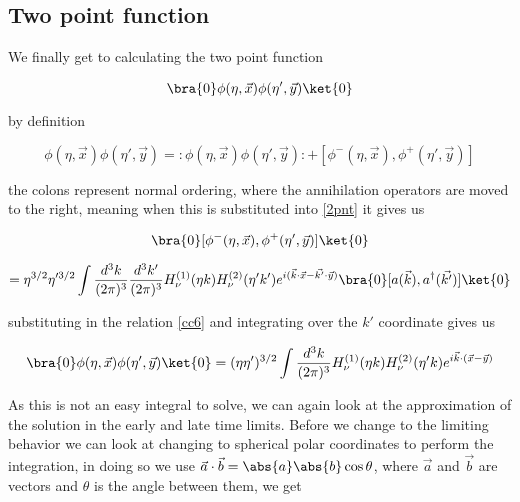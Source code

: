 \documentclass[a4paper,11pt]{article}
\numberwithin{equation}{section}
\numberwithin{figure}{section}
\begin{document}
\begin{large}
\newpage

\subsection{Two point function}

We finally get to calculating the two point function \cite{3b2903c7-c2cb-3309-ac15-1a49103c4ea5,Akhmedov_2020}

\begin{equation}
\label{2pnt}    
    \bra{0}\phi(\eta,\Vec{x})\phi(\eta',\Vec{y})\ket{0}
\end{equation}

by definition 

\begin{equation}
\label{normalorder and com}    
    \phi(\eta,\Vec{x})\phi(\eta',\Vec{y})=:\phi(\eta,\Vec{x})\phi(\eta',\Vec{y}):+[\phi^-(\eta,\Vec{x}),\phi^+(\eta',\Vec{y})]
\end{equation}

the colons represent normal ordering, where the annihilation operators are moved to the right, meaning when this is substituted into \eqref{2pnt} it gives us

\begin{equation}
\label{2point}    
    \bra{0}[\phi^-(\eta,\Vec{x}),\phi^+(\eta',\Vec{y})]\ket{0}
\end{equation}

\begin{equation}
\label{2pointcalc}
    =\eta^{3/2}\eta'^{3/2}\int \frac{d^3k}{(2\pi)^3}\frac{d^3k'}{(2\pi)^3}H^{(1)}_\nu(\eta k)H^{(2)}_\nu(\eta'k')e^{i(\Vec{k}\cdot\Vec{x}-\Vec{k'}\cdot\Vec{y})}\bra{0}[a(\Vec{k}),a^\dagger(\Vec{k'})]\ket{0}
\end{equation}

substituting in the relation \eqref{cc6} and integrating over the $k'$ coordinate gives us

\begin{equation}
\label{2pointsol}    
    \bra{0} \phi(\eta,\Vec{x})\phi(\eta',\Vec{y})\ket{0}=(\eta\eta')^{3/2}\int \frac{d^3k}{(2\pi)^3}H^{(1)}_\nu(\eta k)H^{(2)}_\nu(\eta'k)e^{i\Vec{k}\cdot(\Vec{x}-\Vec{y})}
\end{equation}

As this is not an easy integral to solve, we can again look at the approximation of the solution in the early and late time limits. Before we change to the limiting behavior we can look at changing to spherical polar coordinates to perform the integration, in doing so we use $\Vec{a}\cdot\Vec{b}=\abs{a}\abs{b}\cos \theta$, where $\Vec{a}$ and $\Vec{b}$ are vectors and $\theta$ is the angle between them, we get


\end{large}
\end{document}
